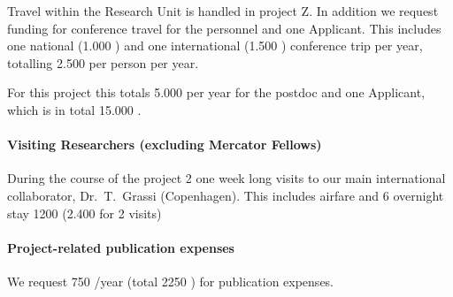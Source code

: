 \documentclass[10pt,fleqn,twoside]{article}
\begin{document}
Travel within the Research Unit is handled in project Z. In addition we
request funding for conference travel for the personnel and one Applicant.
This includes one national (1.000 \EUR{}) and one international (1.500 \EUR{})
conference trip per year, totalling 2.500 \EUR{} per person per year. 

For this project this totals 5.000 \EUR{} per year for the postdoc
and one Applicant, which is in total 15.000 \EUR{}.


\paragraph{Visiting Researchers (excluding Mercator Fellows)}

During the course of the project 2 one week long visits to our main
international collaborator, Dr.~T.~Grassi (Copenhagen).
This includes airfare and 6 overnight stay 1200 \EUR{} (2.400 \EUR{} for 2 visits)





\paragraph{Project-related publication expenses}

We request 750 \EUR{}/year (total 2250 \EUR{}) for publication expenses.






\end{document}
